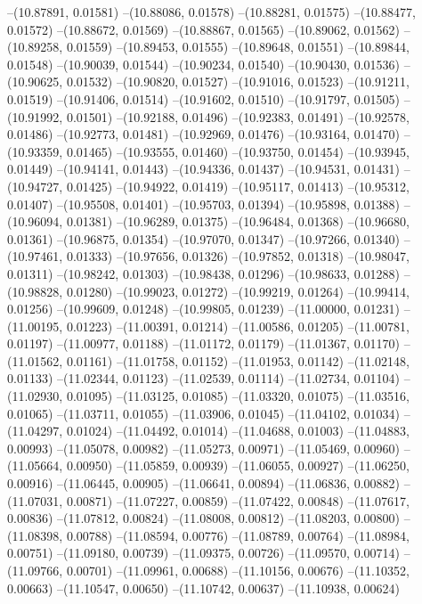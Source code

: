 --(10.87891, 0.01581)
--(10.88086, 0.01578)
--(10.88281, 0.01575)
--(10.88477, 0.01572)
--(10.88672, 0.01569)
--(10.88867, 0.01565)
--(10.89062, 0.01562)
--(10.89258, 0.01559)
--(10.89453, 0.01555)
--(10.89648, 0.01551)
--(10.89844, 0.01548)
--(10.90039, 0.01544)
--(10.90234, 0.01540)
--(10.90430, 0.01536)
--(10.90625, 0.01532)
--(10.90820, 0.01527)
--(10.91016, 0.01523)
--(10.91211, 0.01519)
--(10.91406, 0.01514)
--(10.91602, 0.01510)
--(10.91797, 0.01505)
--(10.91992, 0.01501)
--(10.92188, 0.01496)
--(10.92383, 0.01491)
--(10.92578, 0.01486)
--(10.92773, 0.01481)
--(10.92969, 0.01476)
--(10.93164, 0.01470)
--(10.93359, 0.01465)
--(10.93555, 0.01460)
--(10.93750, 0.01454)
--(10.93945, 0.01449)
--(10.94141, 0.01443)
--(10.94336, 0.01437)
--(10.94531, 0.01431)
--(10.94727, 0.01425)
--(10.94922, 0.01419)
--(10.95117, 0.01413)
--(10.95312, 0.01407)
--(10.95508, 0.01401)
--(10.95703, 0.01394)
--(10.95898, 0.01388)
--(10.96094, 0.01381)
--(10.96289, 0.01375)
--(10.96484, 0.01368)
--(10.96680, 0.01361)
--(10.96875, 0.01354)
--(10.97070, 0.01347)
--(10.97266, 0.01340)
--(10.97461, 0.01333)
--(10.97656, 0.01326)
--(10.97852, 0.01318)
--(10.98047, 0.01311)
--(10.98242, 0.01303)
--(10.98438, 0.01296)
--(10.98633, 0.01288)
--(10.98828, 0.01280)
--(10.99023, 0.01272)
--(10.99219, 0.01264)
--(10.99414, 0.01256)
--(10.99609, 0.01248)
--(10.99805, 0.01239)
--(11.00000, 0.01231)
--(11.00195, 0.01223)
--(11.00391, 0.01214)
--(11.00586, 0.01205)
--(11.00781, 0.01197)
--(11.00977, 0.01188)
--(11.01172, 0.01179)
--(11.01367, 0.01170)
--(11.01562, 0.01161)
--(11.01758, 0.01152)
--(11.01953, 0.01142)
--(11.02148, 0.01133)
--(11.02344, 0.01123)
--(11.02539, 0.01114)
--(11.02734, 0.01104)
--(11.02930, 0.01095)
--(11.03125, 0.01085)
--(11.03320, 0.01075)
--(11.03516, 0.01065)
--(11.03711, 0.01055)
--(11.03906, 0.01045)
--(11.04102, 0.01034)
--(11.04297, 0.01024)
--(11.04492, 0.01014)
--(11.04688, 0.01003)
--(11.04883, 0.00993)
--(11.05078, 0.00982)
--(11.05273, 0.00971)
--(11.05469, 0.00960)
--(11.05664, 0.00950)
--(11.05859, 0.00939)
--(11.06055, 0.00927)
--(11.06250, 0.00916)
--(11.06445, 0.00905)
--(11.06641, 0.00894)
--(11.06836, 0.00882)
--(11.07031, 0.00871)
--(11.07227, 0.00859)
--(11.07422, 0.00848)
--(11.07617, 0.00836)
--(11.07812, 0.00824)
--(11.08008, 0.00812)
--(11.08203, 0.00800)
--(11.08398, 0.00788)
--(11.08594, 0.00776)
--(11.08789, 0.00764)
--(11.08984, 0.00751)
--(11.09180, 0.00739)
--(11.09375, 0.00726)
--(11.09570, 0.00714)
--(11.09766, 0.00701)
--(11.09961, 0.00688)
--(11.10156, 0.00676)
--(11.10352, 0.00663)
--(11.10547, 0.00650)
--(11.10742, 0.00637)
--(11.10938, 0.00624)
